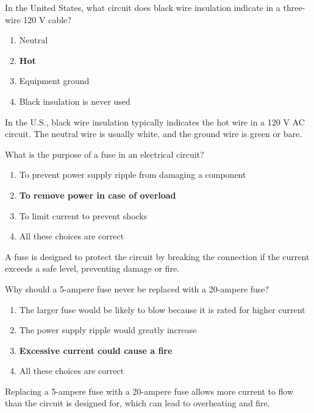 
\begin{tcolorbox}[colback=gray!10!white,colframe=black!75!black,title={T0A03}]
    In the United States, what circuit does black wire insulation indicate in a three-wire 120 V cable?
    \begin{enumerate}[label=\Alph*),noitemsep]
        \item Neutral
        \item \textbf{Hot}
        \item Equipment ground
        \item Black insulation is never used
    \end{enumerate}
\end{tcolorbox}
In the U.S., black wire insulation typically indicates the hot wire in a 120 V AC circuit. The neutral wire is usually white, and the ground wire is green or bare.


\begin{tcolorbox}[colback=gray!10!white,colframe=black!75!black,title={T0A04}]
    What is the purpose of a fuse in an electrical circuit?
    \begin{enumerate}[label=\Alph*),noitemsep]
        \item To prevent power supply ripple from damaging a component
        \item \textbf{To remove power in case of overload}
        \item To limit current to prevent shocks
        \item All these choices are correct
    \end{enumerate}
\end{tcolorbox}
A fuse is designed to protect the circuit by breaking the connection if the current exceeds a safe level, preventing damage or fire.


\begin{tcolorbox}[colback=gray!10!white,colframe=black!75!black,title={T0A05}]
    Why should a 5-ampere fuse never be replaced with a 20-ampere fuse?
    \begin{enumerate}[label=\Alph*),noitemsep]
        \item The larger fuse would be likely to blow because it is rated for higher current
        \item The power supply ripple would greatly increase
        \item \textbf{Excessive current could cause a fire}
        \item All these choices are correct
    \end{enumerate}
\end{tcolorbox}
Replacing a 5-ampere fuse with a 20-ampere fuse allows more current to flow than the circuit is designed for, which can lead to overheating and fire.


